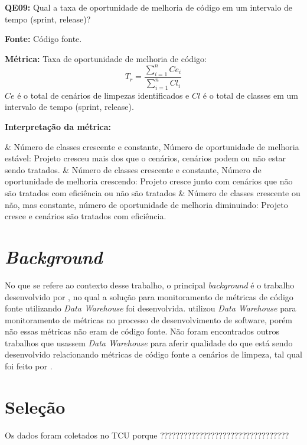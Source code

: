 
\textbf{QE09: } Qual a taxa de oportunidade de melhoria de código em um intervalo de tempo (sprint, release)? 

\textbf{Fonte:} Código fonte.

\textbf{Métrica:} Taxa de oportunidade de melhoria de código: $$ T_r =   \frac{{\sum_{i=1}^{n}{Ce_i}}}{\sum_{i=1}^{n}{Cl_i}} $$ $ Ce $ é o total de cenários de limpezas identificados e $ Cl $  é o total de classes em um intervalo de tempo (sprint, release).

\textbf{Interpretação da métrica: } 

\begin{easylist}[itemize]	
	& Número de classes crescente e constante, Número de oportunidade de melhoria estável: Projeto cresceu mais dos 	que o cenários, cenários podem ou não estar sendo tratados.
	& Número de classes crescente e constante, Número de oportunidade de melhoria crescendo: Projeto cresce junto 		com cenários que não são tratados com eficiência ou não são tratados
	& Número de classes crescente ou não, mas constante, número de oportunidade de melhoria diminuindo: Projeto 		cresce e cenários são tratados com eficiência.	
	\end{easylist}	

\section{\textit{Background}}

No que se refere ao contexto desse trabalho, o principal \textit{background} é o trabalho desenvolvido por , no qual a solução para monitoramento de métricas de código fonte utilizando \textit{Data Warehouse} foi desenvolvida.  utilizou \textit{Data Warehouse} para monitoramento de métricas no processo de desenvolvimento de software, porém não essas métricas não eram de código fonte. Não foram encontrados outros trabalhos que usassem \textit{Data Warehouse} para aferir qualidade do que está sendo desenvolvido relacionando métricas de código fonte a cenários de limpeza, tal qual foi feito por .

\section{Seleção}

Os dados foram coletados no TCU porque ?????????????????????????????????

